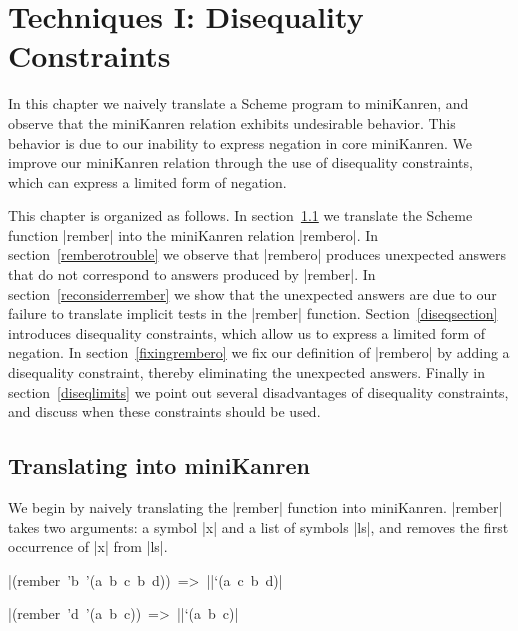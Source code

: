 \chapter{Techniques I:  Disequality Constraints}\label{diseqchapter}

In this chapter we naively translate a Scheme program to miniKanren,
and observe that the miniKanren relation exhibits undesirable
behavior.  This behavior is due to our inability to express negation
in core miniKanren.  We improve our miniKanren relation through the use of
disequality constraints, which can express a limited form of negation.

This chapter is organized as follows.  In
section~\ref{translaterember} we translate the Scheme function 
\mbox{\scheme|rember|} into the miniKanren relation \mbox{\scheme|rembero|}.
In section~\ref{remberotrouble} we observe that
\mbox{\scheme|rembero|} produces unexpected answers that do not
correspond to answers produced by \mbox{\scheme|rember|}.  In
section~\ref{reconsiderrember} we show that the unexpected answers are
due to our failure to translate implicit tests in the
\mbox{\scheme|rember|} function.  Section~\ref{diseqsection}
introduces disequality constraints, which allow us to express a
limited form of negation.  In section~\ref{fixingrembero} we fix our
definition of \mbox{\scheme|rembero|} by adding a disequality
constraint, thereby eliminating the unexpected answers.  Finally in
section~\ref{diseqlimits} we point out several disadvantages of
disequality constraints, and discuss when these constraints should be
used.

\section{Translating {\rembersymbol} into miniKanren}\label{translaterember}

We begin by naively translating the \scheme|rember| function into
miniKanren.  \mbox{\scheme|rember|} takes two arguments: a symbol \scheme|x| and a
list of symbols \scheme|ls|, and removes the first occurrence of
\scheme|x| from \scheme|ls|.

\wspace

\noindent\mbox{\scheme|(rember 'b '(a b c b d)) => |}\mbox{\schemeresult|`(a c b d)|}

\wspace

\noindent\mbox{\scheme|(rember 'd '(a b c)) => |}\mbox{\schemeresult|`(a b c)|}


